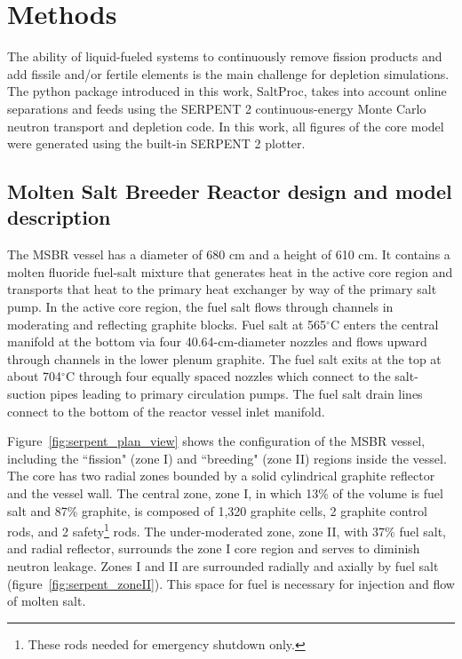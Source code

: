 \section{Methods}

The ability of liquid-fueled systems to continuously remove fission products and add 
fissile and/or fertile elements is the main challenge for depletion simulations. 
The python package introduced in this work, SaltProc, takes into account online 
separations and feeds using the SERPENT 2 continuous-energy Monte Carlo neutron 
transport and depletion code. In this work, all figures of the core model
were generated using the built-in SERPENT 2 plotter. 

\subsection{Molten Salt Breeder Reactor design and model description}
The \gls{MSBR} vessel has a diameter of 680 cm and a height of 610 cm. It 
contains a molten fluoride fuel-salt mixture that generates heat in the active 
core region and transports that heat to the primary heat exchanger by way of 
the primary salt pump. In the active core region, the fuel salt flows through 
channels in moderating and reflecting graphite blocks. Fuel salt at
565$^{\circ}$C enters the central manifold at the bottom via four 
40.64-cm-diameter nozzles and flows upward through channels in the lower plenum 
graphite. The fuel salt exits at the top at about 704$^{\circ}$C through four 
equally spaced nozzles which connect to the salt-suction pipes leading to 
primary circulation pumps. The fuel salt drain lines connect to the bottom of 
the reactor vessel inlet manifold.

Figure~\ref{fig:serpent_plan_view} shows the configuration of the 
\gls{MSBR} vessel, including the ``fission" (zone I) and ``breeding" 
(zone II) regions inside the vessel. The core has two radial zones bounded by a 
solid cylindrical graphite reflector and the vessel wall. The central zone, 
zone I, in which 13\% of the volume is fuel salt and 87\% graphite, is
composed of 1,320 graphite cells, 2 graphite control rods, and 2 
safety\footnote{ These rods needed for emergency shutdown only.} rods. The 
under-moderated zone, zone II, with 37\% fuel salt, and radial reflector, 
surrounds the zone I core region and serves to diminish neutron leakage. Zones 
I and II are surrounded radially and axially by fuel salt 
(figure~\ref{fig:serpent_zoneII}). This space for fuel is necessary for 
injection and flow of molten salt.

